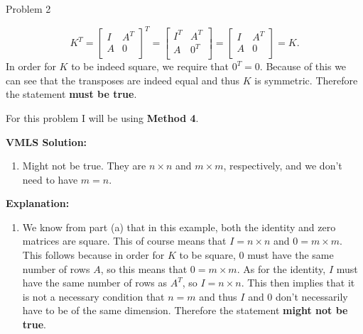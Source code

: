 \begin{problem}{Problem 2}
\begin{Highlight}
\begin{enumerate}[label = (\alph*), start = 3]
            \begin{equation}
                K^{T} = 
                \begin{bmatrix}
                    I & A^{T} \\
                    A & 0 \\
                \end{bmatrix}^{T}
                = 
                \begin{bmatrix}
                    I^{T} & A^{T} \\
                    A & 0^{T} \\
                \end{bmatrix}
                = 
                \begin{bmatrix}
                    I & A^{T} \\
                    A & 0 \\
                \end{bmatrix}
                = K.
            \end{equation}
            In order for $K$ to be indeed square, we require that $0^{T} = 0$. Because of this we can see that the transposes are indeed equal and thus $K$ is symmetric. Therefore the statement 
            \textbf{must be true}.
        \end{enumerate}
    \end{Highlight}

    \begin{Highlight}
        For this problem I will be using \textbf{Method 4}. \vspace*{1em}

        \noindent \textbf{VMLS Solution:}

        \begin{enumerate}[label = (\alph*), start = 4]
            \item Might not be true. They are $n \times n$ and $m \times m$, respectively, and we don’t need to have $m = n$.
        \end{enumerate}

        \noindent \textbf{Explanation:}

        \begin{enumerate}[label = (\alph*), start = 4]
            \item We know from part (a) that in this example, both the identity and zero matrices are square. This of course means that $I = n \times n$ and $0 = m \times m$. This follows because
            in order for $K$ to be square, 0 must have the same number of rows $A$, so this means that $0 = m \times m$. As for the identity, $I$ must have the same number of rows as $A^{T}$, so
            $I = n \times n$. This then implies that it is not a necessary condition that $n = m$ and thus $I$ and 0 don't necessarily have to be of the same dimension. Therefore the statement
            \textbf{might not be true}.
        \end{enumerate}
    \end{Highlight}


\end{problem}
